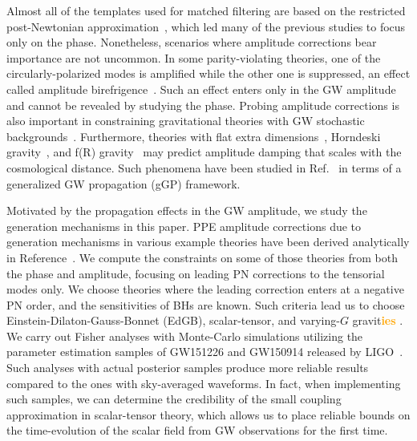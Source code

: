 \documentclass[prd,twocolumn,nofootinbib]{revtex4-1}
\newcommand{\zack}[1]{\textcolor{orange}{\textbf{#1}} }
\begin{document}
Almost all of the templates used for matched filtering are based on the restricted post-Newtonian approximation~\cite{VanDenBroeck:2006qu}, which led many of the previous studies to focus only on the phase. Nonetheless, scenarios where amplitude corrections bear importance  are not uncommon. In some parity-violating theories, one of the circularly-polarized modes is amplified while the other one is suppressed, an effect called amplitude birefrigence~\cite{Alexander:2007kv,Yunes:2008bu,Yunes:2010yf,Yagi:2017zhb}. Such an effect enters only in the GW amplitude and cannot be revealed by studying the phase. Probing amplitude corrections is also important in constraining gravitational theories with GW stochastic backgrounds~\cite{Maselli:2016ekw}. Furthermore, theories with flat extra dimensions~\cite{Cardoso:2002pa}, Horndeski gravity~\cite{Saltas:2014dha}, and f(R) gravity~\cite{Hwang:1996xh} may predict amplitude damping that scales with the cosmological distance. Such phenomena have been studied in Ref.~\cite{Nishizawa:2017nef}  in terms of a generalized GW propagation (gGP) framework. 



Motivated by the propagation effects in the GW amplitude, we study the generation mechanisms in this paper. PPE amplitude corrections due to generation mechanisms in various example theories have been derived analytically in Reference~\cite{Tahura:2018zuq}. We compute the constraints on some of those theories from both the phase and amplitude, focusing on leading PN corrections to the tensorial modes only. We choose theories where the leading correction enters at a negative PN order, and the sensitivities of BHs are known. Such criteria lead us to choose Einstein-Dilaton-Gauss-Bonnet (EdGB), scalar-tensor, and varying-$G$ gravit\zack{ies}. We carry out Fisher analyses with Monte-Carlo simulations utilizing the parameter estimation samples of GW151226 and GW150914 released by LIGO~\cite{ligo:sample}. Such analyses with actual posterior samples produce more reliable results compared to the ones with sky-averaged waveforms. In fact, when implementing such samples, we can determine the credibility of the small coupling approximation in scalar-tensor theory, which allows us to place reliable bounds on the time-evolution of the scalar field from GW observations for the first time.
\end{document}
